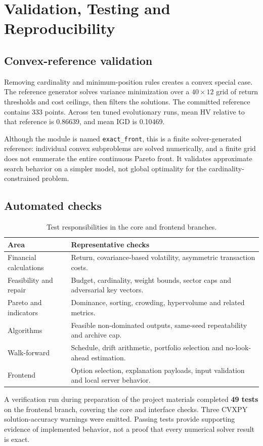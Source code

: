 \documentclass[12pt,a4paper]{article}
\newcommand{\newsec}[1]{\section{#1}}
\begin{document}
\newsec{Validation, Testing and Reproducibility}
\subsection{Convex-reference validation}
Removing cardinality and minimum-position rules creates a convex special case. The reference generator solves variance minimization over a $40\times12$ grid of return thresholds and cost ceilings, then filters the solutions. The committed reference contains 333 points. Across ten tuned evolutionary runs, mean HV relative to that reference is 0.86639, and mean IGD is 0.10469.

Although the module is named \texttt{exact\_front}, this is a finite solver-generated reference: individual convex subproblems are solved numerically, and a finite grid does not enumerate the entire continuous Pareto front. It validates approximate search behavior on a simpler model, not global optimality for the cardinality-constrained problem.
\subsection{Automated checks}
\begin{table}[H]\centering\small
\begin{tabularx}{\linewidth}{@{}p{42mm}Y@{}}\toprule
Area & Representative checks\\\midrule
Financial calculations & Return, covariance-based volatility, asymmetric transaction costs.\\
Feasibility and repair & Budget, cardinality, weight bounds, sector caps and adversarial key vectors.\\
Pareto and indicators & Dominance, sorting, crowding, hypervolume and related metrics.\\
Algorithms & Feasible non-dominated outputs, same-seed repeatability and archive cap.\\
Walk-forward & Schedule, drift arithmetic, portfolio selection and no-look-ahead estimation.\\
Frontend & Option selection, explanation payloads, input validation and local server behavior.\\\bottomrule
\end{tabularx}
\caption{Test responsibilities in the core and frontend branches.}
\end{table}
A verification run during preparation of the project materials completed \textbf{49 tests} on the frontend branch, covering the core and interface checks. Three CVXPY solution-accuracy warnings were emitted. Passing tests provide supporting evidence of implemented behavior, not a proof that every numerical solver result is exact.
\end{document}
